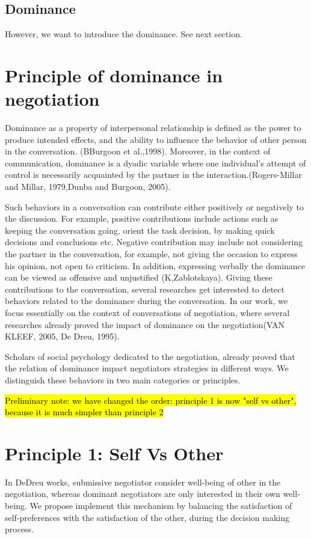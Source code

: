 \documentclass{llncs}
\begin{document}
\subsection{Dominance}

However, we want to introduce the dominance. See next section.


\section{Principle of dominance in negotiation}
\par Dominance as a property of interpersonal relationship is defined as the power to produce intended effects, and the ability to influence the behavior of other person in the conversation. (BBurgoon et al.,1998).
Moreover, in the context of communication, dominance is a dyadic variable where one individual's attempt of control is necessarily acquainted by the partner in the interaction.(Rogers-Millar and Millar, 1979,Dunba and Burgoon, 2005). 

\par Such behaviors in a conversation can contribute either positively or negatively to the discussion. For example, positive contributions include actions such as keeping the conversation going, orient the task decision, by making quick decisions and conclusions etc. Negative contribution may include not considering the partner in the conversation, for example, not giving the occasion to express his opinion, not open to criticism. In addition, expressing verbally the dominance can be viewed as offensive and unjustified (K,Zablotskaya). Giving these contributions to the conversation, several researches get interested to detect  behaviors related to the dominance during the conversation. In our work, we focus essentially on the context of conversations of negotiation, where several researches already proved the impact of dominance on the negotiation(VAN KLEEF, 2005, De Dreu, 1995). 

\par Scholars of social psychology dedicated to the negotiation, already proved that the relation of dominance impact negotiators strategies in different ways. We distinguish these behaviors in two main categories or principles.

\hl{Preliminary note: we have changed the order: principle 1 is now "self vs other", because it is much simpler than principle 2}


\section{Principle 1: Self Vs Other}
In DeDreu works, submissive negotiator consider well-being of other in the negotiation, whereas dominant negotiators are only interested in their own well-being. We propose implement this mechanism by balancing the satisfaction of self-preferences with the satisfaction of the other, during the decision making process.
\end{document}
